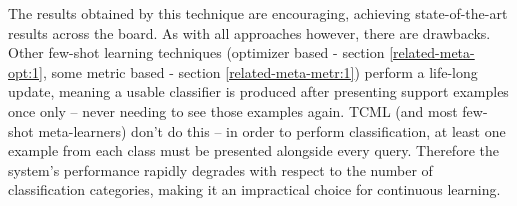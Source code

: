 \documentclass{report}
\begin{document}
The results obtained by this technique are encouraging, achieving state-of-the-art results across the board. As with all approaches however, there are drawbacks. Other few-shot learning techniques (optimizer based - section \ref{related-meta-opt:1}, some metric based - section \ref{related-meta-metr:1}) perform a life-long update, meaning a usable classifier is produced after presenting support examples once only -- never needing to see those examples again. TCML (and most few-shot meta-learners) don't do this -- in order to perform classification, at least one example from each class must be presented alongside every query. Therefore the system's performance rapidly degrades with respect to the number of classification categories, making it an impractical choice for continuous learning. \par
\end{document}
